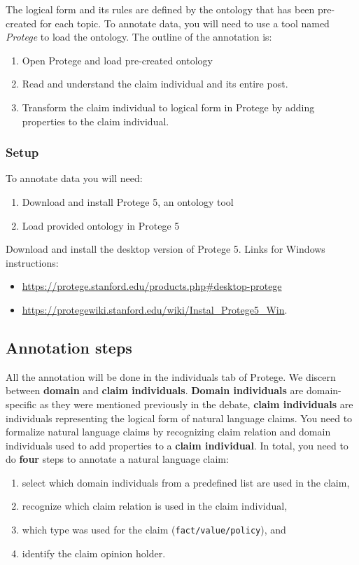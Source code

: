 \noindent The logical form and its rules are defined by the ontology that has been
pre-created for each topic. To annotate data, you will need to use a tool named
\textit{Protege} to load the ontology. 
The outline of the annotation is: 
\begin{enumerate}
\item Open Protege and load pre-created ontology
\item Read and understand the claim individual and its entire post.  
\item Transform the claim individual to logical form in Protege by adding properties to the claim
individual. 
\end{enumerate}

\subsubsection*{Setup}

To annotate data you will need:
\begin{enumerate}
\item Download and install Protege 5, an ontology tool
\item Load provided ontology in Protege 5
\end{enumerate}
Download and install the desktop version of Protege 5. Links for Windows instructions:
\begin{itemize}
\item \url{https://protege.stanford.edu/products.php#desktop-protege}
\item \url{https://protegewiki.stanford.edu/wiki/Instal_Protege5_Win}.
\end{itemize}

\subsection*{Annotation steps}

All the annotation will be done in the individuals tab of Protege. 
We discern between \textbf{domain} and \textbf{claim individuals}. 
\textbf{Domain individuals} are domain-specific as they
were mentioned previously in the debate, \textbf{claim individuals} are individuals
representing the logical form of natural language claims. 
You need to formalize natural language claims 
by recognizing claim relation and domain individuals
used to add properties to a \textbf{claim individual}. In total, you need to do \textbf{four}
steps to annotate a natural language claim:
\begin{enumerate}[label=\textbf{Step \arabic*.}, leftmargin=2cm]
\item select which domain individuals from a predefined list are used in the claim,
\item recognize which claim relation is used in the claim individual, 
\item which type was used for the claim (\texttt{fact/value/policy}), and 
\item identify the claim opinion holder. 
\end{enumerate}


